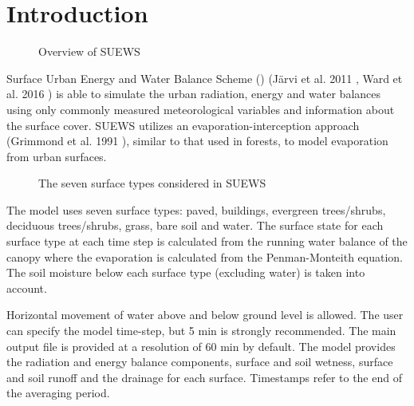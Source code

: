 \documentclass[letterpaper,10pt,english]{sphinxmanual}
\begin{document}


\chapter{Introduction}
\label{\detokenize{introduction:introduction}}\label{\detokenize{introduction::doc}}
\begin{figure}[htbp]
\centering
\capstart

\noindent{}
\caption{Overview of SUEWS}\label{\detokenize{introduction:id4}}\end{figure}

Surface Urban Energy and Water Balance Scheme () (Järvi et al.
2011 \label{\detokenize{introduction:id1}}{\hyperref[\detokenize{references:j11}]{\sphinxcrossref{{[}J11{]}}}}, Ward et al. 2016 \label{\detokenize{introduction:id2}}{\hyperref[\detokenize{references:w16}]{\sphinxcrossref{{[}W16{]}}}}) is able to simulate the urban
radiation, energy and water balances using only commonly measured
meteorological variables and information about the surface cover. SUEWS
utilizes an evaporation-interception approach (Grimmond et al.
1991 \label{\detokenize{introduction:id3}}{\hyperref[\detokenize{references:g91}]{\sphinxcrossref{{[}G91{]}}}}), similar to that used in forests, to model evaporation from
urban surfaces.

\begin{figure}[htbp]
\centering
\capstart

\noindent{}
\caption{The seven surface types considered in SUEWS}\label{\detokenize{introduction:id5}}\end{figure}

The model uses seven surface types: paved, buildings, evergreen
trees/shrubs, deciduous trees/shrubs, grass, bare soil and water. The
surface state for each surface type at each time step is calculated from
the running water balance of the canopy where the evaporation is
calculated from the Penman-Monteith equation. The soil moisture below
each surface type (excluding water) is taken into account.

Horizontal movement of water above and below ground level is allowed.
The user can specify the model time-step, but 5 min is strongly
recommended. The main output file is provided at a resolution of 60 min
by default. The model provides the radiation and energy balance
components, surface and soil wetness, surface and soil runoff and the
drainage for each surface. Timestamps refer to the end of the averaging
period.
\end{document}
